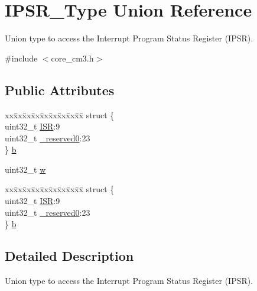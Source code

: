 \hypertarget{union_i_p_s_r___type}{\section{I\-P\-S\-R\-\_\-\-Type Union Reference}
\label{union_i_p_s_r___type}
}


Union type to access the Interrupt Program Status Register (I\-P\-S\-R).  




{\ttfamily \#include $<$core\-\_\-cm3.\-h$>$}

\subsection*{Public Attributes}
\begin{DoxyCompactItemize}
\item 
\begin{tabbing}
xx\=xx\=xx\=xx\=xx\=xx\=xx\=xx\=xx\=\kill
struct \{\\
\>uint32\_t \hyperlink{union_i_p_s_r___type_ab46e5f1b2f4d17cfb9aca4fffcbb2fa5}{ISR}:9\\
\>uint32\_t \hyperlink{union_i_p_s_r___type_ad2eb0a06de4f03f58874a727716aa9aa}{\_reserved0}:23\\
\} \hyperlink{union_i_p_s_r___type_af8ce11ada7a21e0b119a0f48cb824ce2}{b}\\

\end{tabbing}\item 
uint32\-\_\-t \hyperlink{union_i_p_s_r___type_a4adca999d3a0bc1ae682d73ea7cfa879}{w}
\item 
\begin{tabbing}
xx\=xx\=xx\=xx\=xx\=xx\=xx\=xx\=xx\=\kill
struct \{\\
\>uint32\_t \hyperlink{union_i_p_s_r___type_ab46e5f1b2f4d17cfb9aca4fffcbb2fa5}{ISR}:9\\
\>uint32\_t \hyperlink{union_i_p_s_r___type_ad2eb0a06de4f03f58874a727716aa9aa}{\_reserved0}:23\\
\} \hyperlink{union_i_p_s_r___type_a8694433a871ae74beeb7aa9abeea37bb}{b}\\

\end{tabbing}\end{DoxyCompactItemize}


\subsection{Detailed Description}
Union type to access the Interrupt Program Status Register (I\-P\-S\-R). 


